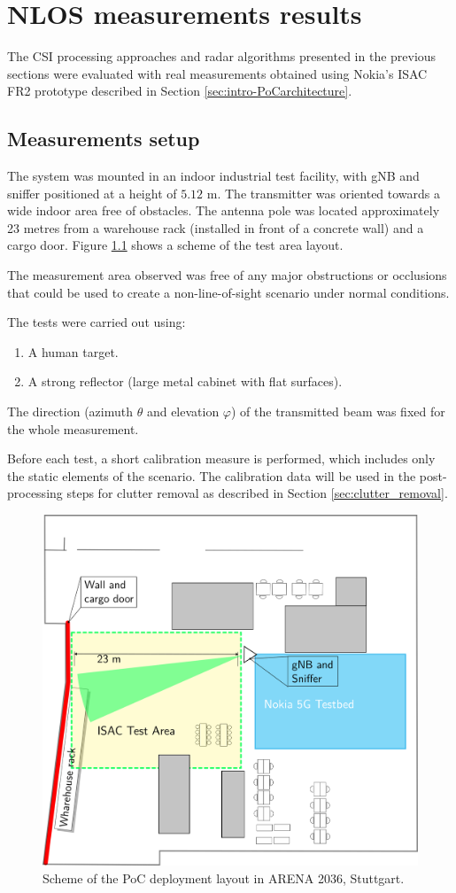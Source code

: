 \chapter{NLOS measurements results}

The CSI processing approaches and radar algorithms presented in the previous sections were evaluated with real measurements obtained using Nokia's ISAC FR2 prototype described in Section \ref{sec:intro-PoCarchitecture}.

\section{Measurements setup}
\label{sec:Test1_meas_scenario}

The system was mounted in an indoor industrial test facility, with gNB and sniffer positioned at a height of $5.12$ m. The transmitter was oriented towards a wide  indoor area free of obstacles. The antenna pole was located approximately 23 metres from a warehouse rack (installed in front of a concrete wall) and a cargo door.
Figure \ref{fig:Test1_arena_plan} shows a scheme of the test area layout.

The measurement area observed was free of any major obstructions or occlusions that could be used to create a non-line-of-sight scenario under normal conditions. 

The tests were carried out using:

\begin{enumerate}
	\item A human target.
	\item A strong reflector (large metal cabinet with flat surfaces).
\end{enumerate}

The direction (azimuth $\theta$ and elevation $\varphi$) of the transmitted beam was fixed for the whole measurement.

Before each test, a short calibration measure is performed, which includes only the static elements of the scenario. The calibration data will be used in the post-processing steps for clutter removal as described in Section \ref{sec:clutter_removal}.

\begin{figure}[H]
	\centering
	\includegraphics[width=.6\textwidth]{Images/Test1/arena_plan}
	\caption{Scheme of the PoC deployment layout in ARENA 2036, Stuttgart.}
	\label{fig:Test1_arena_plan}
\end{figure}


